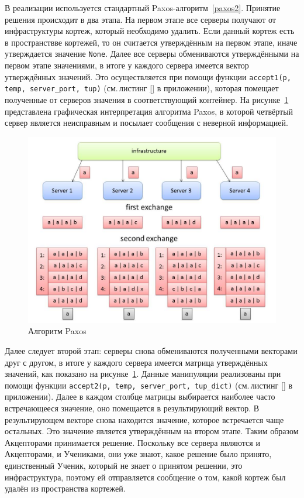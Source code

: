 В реализации используется стандартный Paxos-алгоритм~\ref{paxos2}. Принятие решения происходит в два этапа. На первом этапе все серверы получают от инфраструктуры кортеж, который необходимо удалить. Если данный кортеж есть в пространствве кортежей, то он считается утверждённым на первом этапе, иначе утверждается значение \texttt{None}. Далее все серверы обмениваются утверждёнными на первом этапе значениями, в итоге у каждого сервера имеется вектор утверждённых значений. Это осуществляется при помощи функции \texttt{accept1(p, temp, server_port, tup)} (см.\,листинг \ref{} в приложении), которая помещает полученные от серверов значения в соответствующий контейнер. На рисунке~\ref{paxosjpg} представлена графическая интерпретация алгоритма Paxos, в которой четвёртый сервер является неисправным и посылает сообщения с неверной информацией.
\begin{figure}[H]
	\centering \includegraphics[width=0.8 \textwidth, height=0.6 \textwidth]{img/paxos}  \caption{Алгоритм Paxos} \label{paxosjpg}
\end{figure}
Далее следует второй этап: серверы снова обмениваются полученными векторами друг с другом, в итоге у каждого сервера имеется матрица утверждённых значений, как показано на рисунке~\ref{paxosjpg}. Данные манипуляции реализованы при помощи функции \texttt{accept2(p, temp, server_port, tup_dict)} (см.\,листинг \ref{} в приложении). Далее в каждом столбце матрицы выбирается наиболее часто встречающееся значение, оно помещается в результирующий вектор. В результирующем векторе снова находится значение, которое встречается чаще остальных. Это значение является утверждённым на втором этапе. Таким образом Акцепторами принимается решение. Поскольку все сервера являются и Акцепторами, и Учениками, они уже знают, какое решение было принято, единственный Ученик, который не знает о принятом решении, это инфраструктура, поэтому ей отправляется сообщение о том, какой кортеж был удалён из пространства кортежей.

